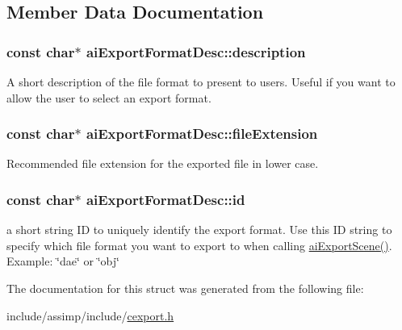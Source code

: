 \subsection{Member Data Documentation}
\hypertarget{structai_export_format_desc_a9c84c4b07c5177fb6539b9bdf90236fb}{
\subsubsection[{description}]{\setlength{\rightskip}{0pt plus 5cm}const char$\ast$ ai\-Export\-Format\-Desc\-::description}}\label{structai_export_format_desc_a9c84c4b07c5177fb6539b9bdf90236fb}
A short description of the file format to present to users. Useful if you want to allow the user to select an export format. \hypertarget{structai_export_format_desc_a589d08d526f253176d09886787cd6b22}{
\subsubsection[{file\-Extension}]{\setlength{\rightskip}{0pt plus 5cm}const char$\ast$ ai\-Export\-Format\-Desc\-::file\-Extension}}\label{structai_export_format_desc_a589d08d526f253176d09886787cd6b22}


Recommended file extension for the exported file in lower case. 

\hypertarget{structai_export_format_desc_afe216eaea3a04abca041e5c253f94bbf}{
\subsubsection[{id}]{\setlength{\rightskip}{0pt plus 5cm}const char$\ast$ ai\-Export\-Format\-Desc\-::id}}\label{structai_export_format_desc_afe216eaea3a04abca041e5c253f94bbf}
a short string I\-D to uniquely identify the export format. Use this I\-D string to specify which file format you want to export to when calling \hyperlink{cexport_8h_a9615510b8430a9da4f435a72148128dd}{ai\-Export\-Scene()}. Example\-: \char`\"{}dae\char`\"{} or \char`\"{}obj\char`\"{} 

The documentation for this struct was generated from the following file\-:\begin{DoxyCompactItemize}
\item 
include/assimp/include/\hyperlink{cexport_8h}{cexport.\-h}\end{DoxyCompactItemize}
